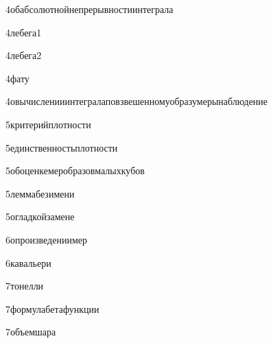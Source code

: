 {4}{обабсолютнойнепрерывностиинтеграла}

{4}{лебега1}

{4}{лебега2}

{4}{фату}

{4}{овычисленииинтегралаповзвешенномуобразумерынаблюдение}

{5}{критерийплотности}

{5}{единственностьплотности}

{5}{обоценкемеробразовмалыхкубов}

{5}{леммабезимени}

{5}{огладкойзамене}

{6}{опроизведениимер}

{6}{кавальери}

{7}{тонелли}

{7}{формулабетафункции}

{7}{объемшара}









